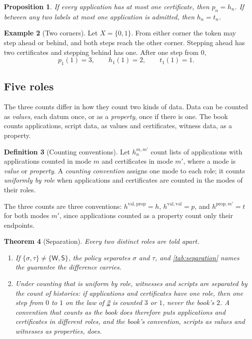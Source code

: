 \documentclass[11pt]{article}
\numberwithin{equation}{section}
\theoremstyle{definition}
\newtheorem{definition}{Definition}[section]
\newtheorem{example}[definition]{Example}
\theoremstyle{plain}
\newtheorem{theorem}[definition]{Theorem}
\newtheorem{proposition}[definition]{Proposition}
\theoremstyle{remark}
\newcommand{\Wit}{\mathsf W}
\newcommand{\Scr}{\mathsf S}
\begin{document}
\begin{proposition}\label{prop:counts-agree}
If every application has at most one certificate, then \(p_n=h_n\).  If
between any two labels at most one application is admitted, then
\(h_n=t_n\).
\end{proposition}

\begin{example}[Two corners]\label{ex:two-corners}
Let \(X=\{0,1\}\).  From either corner the token may step ahead or behind,
and both steps reach the other corner.  Stepping ahead has two certificates
and stepping behind has one.  After one step from \(0\),
\[
 p_1(1)=3,\qquad h_1(1)=2,\qquad t_1(1)=1.
\]
\end{example}

\subsection{Five roles}

The three counts differ in how they count two kinds of data.  Data can be
counted as \emph{values}, each datum once, or as a \emph{property}, once if
there is one.  The book counts applications, script data, as values and
certificates, witness data, as a property.

\begin{definition}[Counting conventions]\label{def:conventions}
Let \(h^{m,m'}_n\) count lists of applications with applications counted in
mode \(m\) and certificates in mode \(m'\), where a mode is \emph{value} or
\emph{property}.  A \emph{counting convention} assigns one mode to each role;
it counts \emph{uniformly by role} when applications and certificates are
counted in the modes of their roles.
\end{definition}

The three counts are three conventions: \(h^{\mathrm{val},\mathrm{prop}}=h\),
\(h^{\mathrm{val},\mathrm{val}}=p\), and \(h^{\mathrm{prop},m'}=t\) for both
modes \(m'\), since applications counted as a property count only their
endpoints.

\begin{theorem}[Separation]\label{thm:separation}
Every two distinct roles are told apart.
\begin{enumerate}[label=(\roman*),leftmargin=2.5em]
\item If \(\{\sigma,\tau\}\ne\{\Wit,\Scr\}\), the policy separates \(\sigma\)
and \(\tau\), and \cref{tab:separation} names the guarantee the difference
carries.
\item Under counting that is uniform by role, witnesses and scripts are
separated by the count of histories: if applications and certificates have
one role, then one step from \(0\) to \(1\) on the law of
\cref{ex:two-corners} is counted \(3\) or \(1\), never the book's \(2\).  A
convention that counts as the book does therefore puts applications and
certificates in different roles, and the book's convention, scripts as values
and witnesses as properties, does.
\end{enumerate}
\end{theorem}
\end{document}
